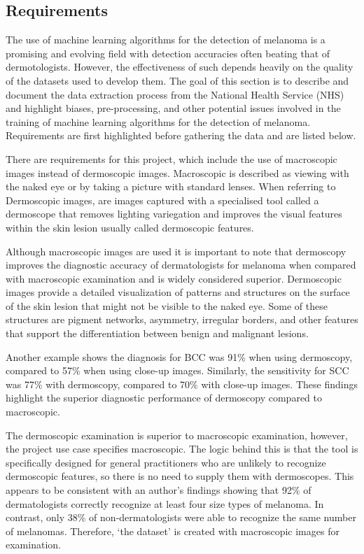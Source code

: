 \subsection{Requirements}
The use of machine learning algorithms for the detection of melanoma is a promising and evolving field with detection accuracies often beating that of dermotologists\cite{Andre2017}. However, the effectiveness of such depends heavily on the quality of the datasets used to develop them\cite{Tae2019}. The goal of this section is to describe and document the data extraction process from the National Health Service (NHS) and highlight biases, pre-processing, and other potential issues involved in the training of machine learning algorithms for the detection of melanoma. Requirements are first highlighted before gathering the data and are listed below.

There are requirements for this project, which include the use of macroscopic images instead of dermoscopic images. Macroscopic is described as viewing with the naked eye or by taking a picture with standard lenses. When referring to Dermoscopic images, are images captured with a specialised tool called a dermoscope that removes lighting variegation and improves the visual features within the skin lesion usually called dermoscopic features.

Although macroscopic images are used it is important to note that dermoscopy improves the diagnostic accuracy of dermatologists for melanoma when compared with macroscopic examination\cite{Wolner2017} and is widely considered superior\cite{Thiers2009}. Dermoscopic images provide a detailed visualization of patterns and structures on the surface of the skin lesion that might not be visible to the naked eye\cite{Thiers2009}. Some of these structures are pigment networks, asymmetry, irregular borders, and other features that support the differentiation between benign and malignant lesions\cite{Thiers2009}. 

Another example shows the diagnosis for BCC was 91\% when using dermoscopy, compared to 57\% when using close-up images\cite{Dascalu2022}. Similarly, the sensitivity for SCC was 77\% with dermoscopy, compared to 70\% with close-up images\cite{Dascalu2022}. These findings highlight the superior diagnostic performance of dermoscopy compared to macroscopic.

The dermoscopic examination is superior to macroscopic examination, however, the project use case specifies macroscopic. The logic behind this is that the tool is specifically designed for general practitioners who are unlikely to recognize dermoscopic features, so there is no need to supply them with dermoscopes. This appears to be consistent with an author's findings showing that 92\% of dermatologists correctly recognize at least four size types of melanoma. In contrast, only 38\% of non-dermatologists were able to recognize the same number of melanomas\cite{Tae2019}. Therefore, `the dataset' is created with macroscopic images for examination.

